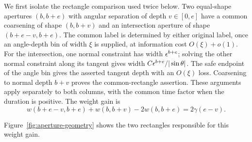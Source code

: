 We first isolate the rectangle comparison used twice below.  Two
equal-shape apertures $(b,b+e)$ with angular separation of depth
$v\in[0,e]$ have a common coarsening of shape $(b,b+v)$ and an
intersection aperture of shape $(b+e-v,b+e)$.  The common label is
determined by either original label, once an angle-depth bin of width
$\xi$ is supplied, at information cost $O(\xi)+o(1)$.  For the
intersection, one normal constraint has width $\epsilon^{b+e}$; solving the
other normal constraint along its tangent gives width
$C\epsilon^{b+e}/|\sin\theta|$.  The safe endpoint of the angle bin gives
the asserted tangent depth with an $O(\xi)$ loss.  Coarsening to normal
depth $b+v$ proves the common-rectangle assertion.  These arguments
apply separately to both columns, with the common time factor when
the duration is positive.  The weight gain is
\begin{equation}
 w(b+e-v,b+e)+w(b,b+v)-2w(b,b+e)=2\gamma(e-v).
 \label{eq:classical-rectangle-gain}
\end{equation}

Figure~\ref{fig:aperture-geometry} shows the two rectangles responsible
for this weight gain.


